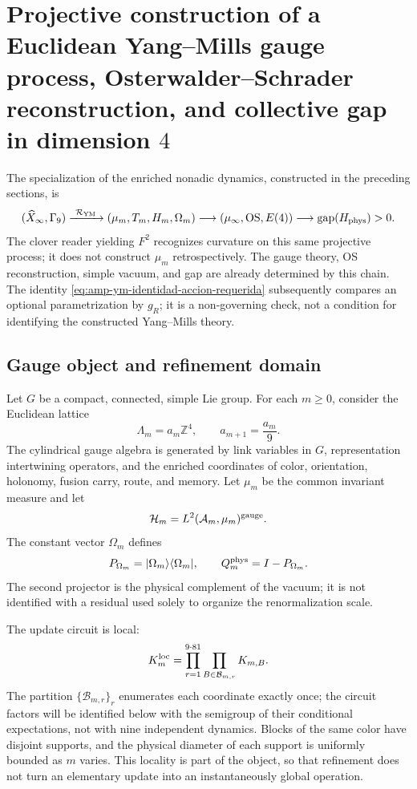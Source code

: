 \section[Euclidean Yang--Mills gauge process in dimension 4]{Projective
construction of a Euclidean Yang--Mills gauge process, Osterwalder--Schrader
reconstruction, and collective gap in dimension \(4\)}


\noindent The specialization of the enriched nonadic dynamics,
constructed in the preceding sections, is
\[
 (\widehat X_\infty,\Gamma_9)
 \xrightarrow{\ \mathcal R_{\rm YM}\ }
 (\mu_m,T_m,H_m,\Omega_m)
 \longrightarrow(\mu_\infty,\mathrm{OS},E(4))
 \longrightarrow\operatorname{gap}(H_{\rm phys})>0.
\]
The clover reader yielding \(F^2\) recognizes curvature on this same
projective process; it does not construct \(\mu_m\) retrospectively. The gauge
theory, OS reconstruction, simple vacuum, and gap are already determined
by this chain. The identity
\eqref{eq:amp-ym-identidad-accion-requerida} subsequently compares an
optional parametrization by \(g_R\); it is a non-governing check, not a
condition for identifying the constructed Yang--Mills theory.

\subsection*{Gauge object and refinement domain}

Let \(G\) be a compact, connected, simple Lie group. For each
\(m\geq0\), consider the Euclidean lattice
\begin{equation}\label{eq:realizaciones-ym-red}
 \Lambda_m=a_m\mathbb Z^4,
 \qquad a_{m+1}=\frac{a_m}{9}.
\end{equation}
The cylindrical gauge algebra is generated by link variables in \(G\),
representation intertwining operators, and the enriched coordinates
of color,
orientation, holonomy, fusion carry, route, and memory. Let \(\mu_m\) be the
common invariant measure and let
\[
 \mathcal H_m=L^2(\mathcal A_m,\mu_m)^{\rm gauge}.
\]
The constant vector \(\Omega_m\) defines
\begin{equation}\label{eq:realizaciones-ym-proyectores}
 P_{\Omega_m}=|\Omega_m\rangle\langle\Omega_m|,
 \qquad Q_m^{\rm phys}=I-P_{\Omega_m}.
\end{equation}
The second projector is the physical complement of the vacuum; it is not identified
with a residual used solely to organize the renormalization
scale.

The update circuit is local:
\begin{equation}\label{eq:realizaciones-ym-circuito}
 K_m^{\rm loc}
 =\prod_{r=1}^{9\cdot81}
   \prod_{B\in\mathcal B_{m,r}}K_{m,B}.
\end{equation}
The partition \(\{\mathcal B_{m,r}\}_r\) enumerates each coordinate exactly once; the circuit
factors will be identified below with the semigroup of their conditional
expectations, not with nine independent dynamics.
Blocks of the same color have disjoint supports, and the physical diameter
of each support is uniformly bounded as \(m\) varies. This locality
is part of the object, so that refinement does not turn an
elementary update into an instantaneously global operation.


